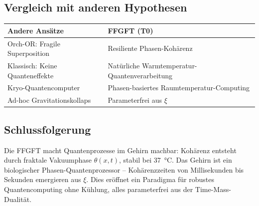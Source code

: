 	\subsection*{Vergleich mit anderen Hypothesen}
	
	\begin{center}
		\begin{tabular}{p{}p{}}
			\textbf{Andere Ansätze} & \textbf{FFGFT (T0)} \\
			\hline
			Orch-OR: Fragile Superposition & Resiliente Phasen-Kohärenz \\
			Klassisch: Keine Quanteneffekte & Natürliche Warmtemperatur-Quantenverarbeitung \\
			Kryo-Quantencomputer & Phasen-basiertes Raumtemperatur-Computing \\
			Ad-hoc Gravitationskollaps & Parameterfrei aus \(\xi\) \\
		\end{tabular}
	\end{center}
	
	\subsection*{Schlussfolgerung}
	
	Die FFGFT macht Quantenprozesse im Gehirn machbar: Kohärenz entsteht durch fraktale Vakuumphase \(\theta(x,t)\), stabil bei \SI{37}{\degreeCelsius}. Das Gehirn ist ein biologischer Phasen-Quantenprozessor – Kohärenzzeiten von Millisekunden bis Sekunden emergieren aus \(\xi\). Dies eröffnet ein Paradigma für robustes Quantencomputing ohne Kühlung, alles parameterfrei aus der Time-Mass-Dualität.



